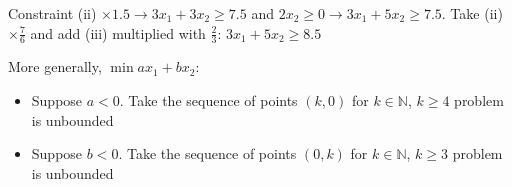 \documentclass[main]{subfiles}
\begin{document}
Constraint (ii) $\times 1.5 \rightarrow 3x_{1} + 3x_{2} \geq 7.5$ and $2x_{2}
\geq 0 \rightarrow 3x_{1} + 5x_{2} \geq 7.5$.
Take (ii) $\times \frac{7}{6}$ and add (iii) multiplied with $\frac{2}{3}$:
$3x_{1} + 5x_{2} \geq 8.5$

More generally, $\min ax_{1} + bx_{2}$:
\begin{itemize}
\item Suppose $a < 0$. Take the sequence of points $(k,0)$ for $k \in
\mathbb{N}$, $k \geq 4$
\subitem problem is unbounded
\item Suppose $b < 0$. Take the sequence of points $(0,k)$ for $k \in
\mathbb{N}$, $k \geq 3$
\subitem problem is unbounded
\end{itemize}
\end{document}
